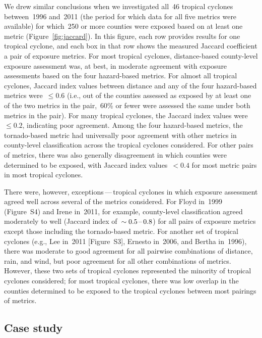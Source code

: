 We drew similar conclusions when we investigated all~46 tropical cyclones
between~1996 and~2011 (the period for which data for all five metrics were
available) for which~250 or more counties were exposed based on at least one
metric (Figure~\ref{fig:jaccard}). In this figure, each row provides results
for one tropical cyclone, and each box in that row shows the measured Jaccard
coefficient a pair of exposure metrics. For most tropical cyclones,
distance-based county-level exposure assessment was, at best, in moderate
agreement with exposure assessments based on the four hazard-based metrics. For
almost all tropical cyclones, Jaccard index values between distance and any of
the four hazard-based metrics were~$\le0.6$ (i.e., out of the counties assessed
as exposed by at least one of the two metrics in the pair,~60\si{\percent} or
fewer were assessed the same under both metrics in the pair). For many tropical
cyclones, the Jaccard index values were~$\le0.2$, indicating poor agreement.
Among the four hazard-based metrics, the tornado-based metric had
universally poor agreement with other metrics in county-level classification
across the tropical cyclones considered.  For other pairs of metrics, there was
also generally disagreement in which counties were determined to be exposed,
with Jaccard index values~$<0.4$ for most metric pairs in most tropical
cyclones.

There were, however, exceptions\,---\,tropical cyclones in which exposure
assessment agreed well across several of the metrics considered.  For Floyd
in~1999 (Figure~S4) and Irene in~2011, for example, county-level classification
agreed moderately to well (Jaccard index of~$\sim 0.5\mbox{\,--\,}0.8$) for all
pairs of exposure metrics except those including the tornado-based metric. For
another set of tropical cyclones (e.g., Lee in~2011 [Figure~S3], Ernesto
in~2006, and Bertha in~1996), there was moderate to good agreement for all
pairwise combinations of distance, rain, and wind, but poor agreement for all
other combinations of metrics.  However, these two sets of tropical cyclones
represented the minority of tropical cyclones considered; for most tropical
cyclones, there was low overlap in the counties determined to be exposed to the
tropical cyclones between most pairings of metrics.

\subsection*{Case study}

